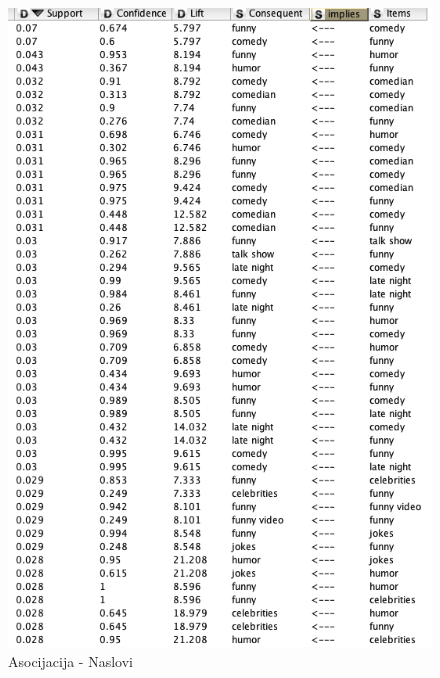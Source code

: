 \documentclass[a4paper]{article}
\theoremstyle{definition}
\begin{document}
\begin{figure}[H]
\begin{center}
    \includegraphics[width=1\textwidth]{association.png}
    \caption{Asocijacija - Naslovi}
    \label{fig:asoc1}
\end{center}
\end{figure}
\end{document}
